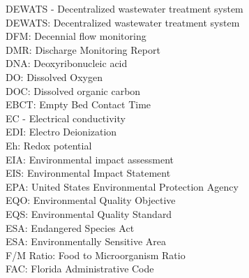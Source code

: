 \documentclass{article}
\begin{document}
DEWATS - Decentralized wastewater treatment system
\vspace{0.3cm}\\
DEWATS:  Decentralized wastewater treatment system
\vspace{0.3cm}\\
DFM:  Decennial flow monitoring
\vspace{0.3cm}\\
DMR:  Discharge Monitoring Report
\vspace{0.3cm}\\
DNA:  Deoxyribonucleic acid
\vspace{0.3cm}\\
DO: Dissolved Oxygen
\vspace{0.3cm}\\
DOC:  Dissolved organic carbon
\vspace{0.3cm}\\
EBCT:  Empty Bed Contact Time
\vspace{0.3cm}\\
EC - Electrical conductivity
\vspace{0.3cm}\\
EDI: Electro Deionization
\vspace{0.3cm}\\
Eh:  Redox potential
\vspace{0.3cm}\\
EIA:  Environmental impact assessment
\vspace{0.3cm}\\
EIS:  Environmental Impact Statement
\vspace{0.3cm}\\
EPA:  United States Environmental Protection Agency
\vspace{0.3cm}\\
EQO:  Environmental Quality Objective
\vspace{0.3cm}\\
EQS:  Environmental Quality Standard
\vspace{0.3cm}\\
ESA:  Endangered Species Act
\vspace{0.3cm}\\
ESA:  Environmentally Sensitive Area
\vspace{0.3cm}\\
F/M Ratio:  Food to Microorganism Ratio
\vspace{0.3cm}\\
FAC:  Florida Administrative Code
\vspace{0.3cm}\\
\end{document}
